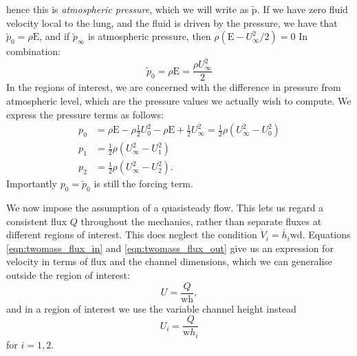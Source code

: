 \documentclass{report}
\begin{document}
hence this is \textit{atmospheric pressure}, which we will write as \(\mathrm{\tilde{p}}\).
If we have zero fluid velocity local to the lung, and the fluid is driven by the pressure,
we have that $\tilde{p}_0 = \rho \mathrm{E}$,
and if $\tilde{p}_\infty$ is atmospheric pressure, then $\rho(\mathrm{E} - U_\infty^2/2) = 0$
In combination:
\begin{equation}
    \tilde{p}_0 = \rho \mathrm{E} = \frac{\rho U_\infty^2}{2}
\end{equation}
In the regions of interest, we are concerned with the difference in pressure from atmospheric level,
which are the pressure values we actually wish to compute.
We express the pressure terms as follows:
\begin{equation}
    \begin{aligned}
        p_0 &= \rho\mathrm{E} - \rho\frac{1}{2}U_0^2 - \rho\mathrm{E} + \frac{1}{2}U_\infty^2 = \frac{1}{2}\rho\left(U_\infty^2 - U_0^2\right) \\
        p_1 &= \frac{1}{2}\rho\left(U_\infty^2 - U_1^2\right) \\
        p_2 &= \frac{1}{2}\rho\left(U_\infty^2 - U_2^2\right).
    \end{aligned}
\end{equation}
Importantly \(p_0 = \tilde{p}_0\) is still the forcing term.


We now impose the assumption of a quasisteady flow.
This lets us regard a consistent flux $Q$ throughout the mechanics,
rather than separate fluxes at different regions of interest.
This does neglect the condition $\dot{V}_i = \dot{h_i}\mathrm{wd}$.
Equations \ref{eqn:twomass_flux_in} and \ref{eqn:twomass_flux_out} give us an expression for velocity in terms of flux and the channel dimensions,
which we can generalise outside the region of interest:
\begin{equation}
    U = \frac{Q}{\mathrm{wh}},
\end{equation}
and in a region of interest we use the variable channel height instead
\begin{equation}
    U_i = \frac{Q}{\mathrm{w}h_i}
\end{equation}
for \(i=1,2\).
\end{document}
